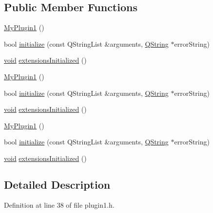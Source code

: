 \subsection*{\-Public \-Member \-Functions}
\begin{DoxyCompactItemize}
\item 
\hyperlink{class_plugin1_1_1_my_plugin1_aa669fad3fa65d610bb17197b34a6d8cf}{\-My\-Plugin1} ()
\item 
bool \hyperlink{class_plugin1_1_1_my_plugin1_abe68963937d1889611b4e3693e585db5}{initialize} (const \-Q\-String\-List \&arguments, \hyperlink{group___u_a_v_objects_plugin_gab9d252f49c333c94a72f97ce3105a32d}{\-Q\-String} $\ast$error\-String)
\item 
\hyperlink{group___u_a_v_objects_plugin_ga444cf2ff3f0ecbe028adce838d373f5c}{void} \hyperlink{class_plugin1_1_1_my_plugin1_ab68d9707ac743bacd4bf109e788e28ea}{extensions\-Initialized} ()
\item 
\hyperlink{class_plugin1_1_1_my_plugin1_ac6ef8b07297e70eaf096da48e0dba7f5}{\-My\-Plugin1} ()
\item 
bool \hyperlink{class_plugin1_1_1_my_plugin1_a4919abec6b960bd7548c4c912bece22c}{initialize} (const \-Q\-String\-List \&arguments, \hyperlink{group___u_a_v_objects_plugin_gab9d252f49c333c94a72f97ce3105a32d}{\-Q\-String} $\ast$error\-String)
\item 
\hyperlink{group___u_a_v_objects_plugin_ga444cf2ff3f0ecbe028adce838d373f5c}{void} \hyperlink{class_plugin1_1_1_my_plugin1_a363f7c72c9d3236f00808af931058527}{extensions\-Initialized} ()
\item 
\hyperlink{class_plugin1_1_1_my_plugin1_ac6ef8b07297e70eaf096da48e0dba7f5}{\-My\-Plugin1} ()
\item 
bool \hyperlink{class_plugin1_1_1_my_plugin1_a4919abec6b960bd7548c4c912bece22c}{initialize} (const \-Q\-String\-List \&arguments, \hyperlink{group___u_a_v_objects_plugin_gab9d252f49c333c94a72f97ce3105a32d}{\-Q\-String} $\ast$error\-String)
\item 
\hyperlink{group___u_a_v_objects_plugin_ga444cf2ff3f0ecbe028adce838d373f5c}{void} \hyperlink{class_plugin1_1_1_my_plugin1_a363f7c72c9d3236f00808af931058527}{extensions\-Initialized} ()
\end{DoxyCompactItemize}


\subsection{\-Detailed \-Description}


\-Definition at line 38 of file plugin1.\-h.



